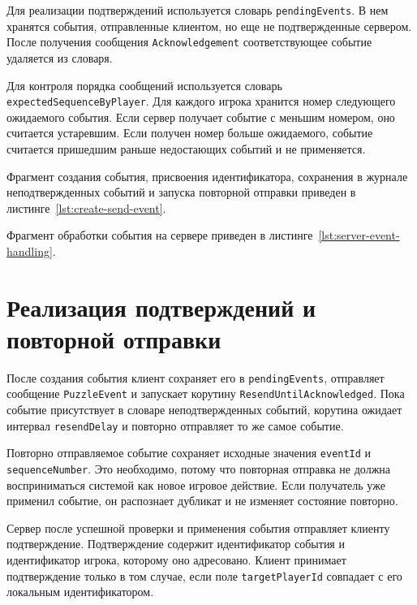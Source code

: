 Для реализации подтверждений используется словарь \texttt{pendingEvents}. В нем хранятся события, отправленные клиентом, но еще не подтвержденные сервером. 
После получения сообщения \texttt{Acknowledgement} соответствующее событие удаляется из словаря.

Для контроля порядка сообщений используется словарь \texttt{expectedSequenceByPlayer}. Для каждого игрока хранится номер следующего ожидаемого события. 
Если сервер получает событие с меньшим номером, оно считается устаревшим. Если получен номер больше ожидаемого, событие считается пришедшим раньше недостающих событий и не применяется.

Фрагмент создания события, присвоения идентификатора, сохранения в журнале неподтвержденных событий и запуска повторной отправки приведен в листинге~\ref{lst:create-send-event}.


Фрагмент обработки события на сервере приведен в листинге~\ref{lst:server-event-handling}.


\section{Реализация подтверждений и повторной отправки}

После создания события клиент сохраняет его в \texttt{pendingEvents}, отправляет сообщение \texttt{PuzzleEvent} и запускает корутину \texttt{ResendUntilAcknowledged}. 
Пока событие присутствует в словаре неподтвержденных событий, корутина ожидает интервал \texttt{resendDelay} и повторно отправляет то же самое событие.

Повторно отправляемое событие сохраняет исходные значения \texttt{eventId} и \texttt{sequenceNumber}. 
Это необходимо, потому что повторная отправка не должна восприниматься системой как новое игровое действие. Если получатель уже применил событие, он распознает дубликат и не изменяет состояние повторно.

Сервер после успешной проверки и применения события отправляет клиенту подтверждение. Подтверждение содержит идентификатор события и идентификатор игрока, которому оно адресовано. Клиент принимает подтверждение только в том случае, если поле \texttt{targetPlayerId} совпадает с его локальным идентификатором.

